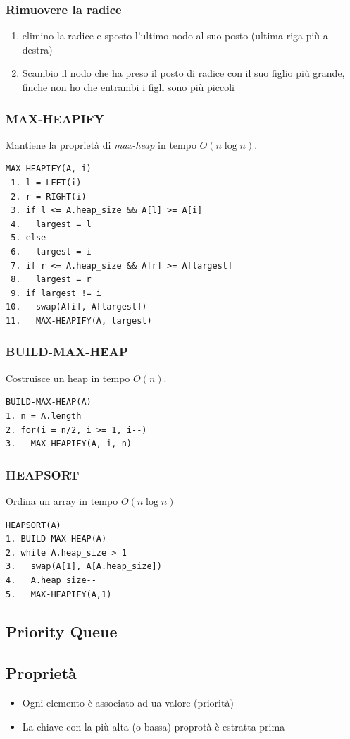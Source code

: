 \documentclass{article}
\begin{document}
\subsubsection*{Rimuovere la radice}
\begin{enumerate}
  \item elimino la radice e sposto l'ultimo nodo al suo posto (ultima riga più a destra)
  \item Scambio il nodo che ha preso il posto di radice con il suo figlio più grande, finche non ho che entrambi i figli sono più piccoli
\end{enumerate}
\subsubsection*{MAX-HEAPIFY}
Mantiene la proprietà di \emph{max-heap} in tempo \(O(n \log n)\).
\begin{verbatim}
MAX-HEAPIFY(A, i)
 1. l = LEFT(i)
 2. r = RIGHT(i)
 3. if l <= A.heap_size && A[l] >= A[i]
 4.   largest = l
 5. else
 6.   largest = i
 7. if r <= A.heap_size && A[r] >= A[largest]
 8.   largest = r
 9. if largest != i
10.   swap(A[i], A[largest])
11.   MAX-HEAPIFY(A, largest)
\end{verbatim}
\subsubsection*{BUILD-MAX-HEAP}
Costruisce un heap in tempo \(O(n)\).
\begin{verbatim}
BUILD-MAX-HEAP(A)
1. n = A.length
2. for(i = n/2, i >= 1, i--)
3.   MAX-HEAPIFY(A, i, n)
\end{verbatim}
\subsubsection*{HEAPSORT}
Ordina un array in tempo \(O(n \log n)\)
\begin{verbatim}
HEAPSORT(A)
1. BUILD-MAX-HEAP(A)
2. while A.heap_size > 1
3.   swap(A[1], A[A.heap_size])
4.   A.heap_size--
5.   MAX-HEAPIFY(A,1)
\end{verbatim}
\pagebreak

\subsection{Priority Queue}
\subsection*{Proprietà}
\begin{itemize}
  \item Ogni elemento è associato ad ua valore (priorità)
  \item La chiave con la più alta (o bassa) proprotà è estratta prima
\end{itemize}
\end{document}
